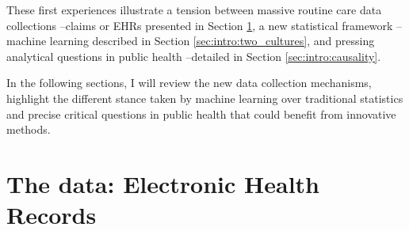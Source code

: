 \documentclass[french,12pt,twoside,a4paper]{book}
\begin{document}
These first experiences illustrate a tension between massive routine care data
collections --claims or EHRs presented in Section \ref{sec:intro:data}, a new
statistical framework --machine learning \citep{breiman2001statistical} described
in Section \ref{sec:intro:two_cultures}, and pressing analytical questions in
public health --detailed in Section \ref{sec:intro:causality}.%

In the following sections, I will review the new data collection mechanisms,
highlight the different stance taken by machine learning over traditional
statistics and precise critical questions in public health that could
benefit from innovative methods.

\section{The data: Electronic Health Records}\label{sec:intro:data}
\end{document}
